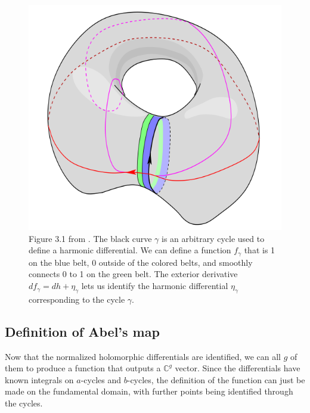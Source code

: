 \begin{figure}
    \center
    \includegraphics{assets/HarmonicDifferential.png}
    \caption{Figure 3.1 from \cite{Ber06}. The black curve $\gamma$ is an arbitrary cycle used to define a harmonic differential. We can define a function $f_\gamma$ that is 1 on the blue belt, 0 outside of the colored belts, and smoothly connects 0 to 1 on the green belt. The exterior derivative $df_\gamma=dh+\eta_\gamma$ lets us identify the harmonic differential $\eta_\gamma$ corresponding to the cycle $\gamma$.}
    \label{figB12:Harmonic}
\end{figure}

\subsection{Definition of Abel's map}

Now that the normalized holomorphic differentials are identified, we can all $g$ of them to produce a function that outputs a $\mathbb C^g$ vector. Since the differentials have known integrals on $a$-cycles and $b$-cycles, the definition of the function can just be made on the fundamental domain, with further points being identified through the cycles.

